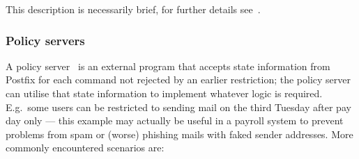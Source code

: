 \documentclass[a4paper,12pt,draft]{article}
\begin{document}
This description is necessarily brief, for further details
see~\cite{smtpd_access_readme, smtpd_per_user_control, policy-servers}.


\subsubsection{Policy servers}

\label{policy servers}

A policy server~\cite{policy-servers} is an external program that accepts
state information from Postfix for each \SMTP{} command not rejected by an
earlier restriction; the policy server can utilise that state information
to implement whatever logic is required.  E.g.\ some users can be
restricted to sending mail on the third Tuesday after pay day only --- this
example may actually be useful in a payroll system to prevent problems from
spam or (worse) phishing mails with faked sender addresses.  More commonly
encountered scenarios are:
\end{document}
